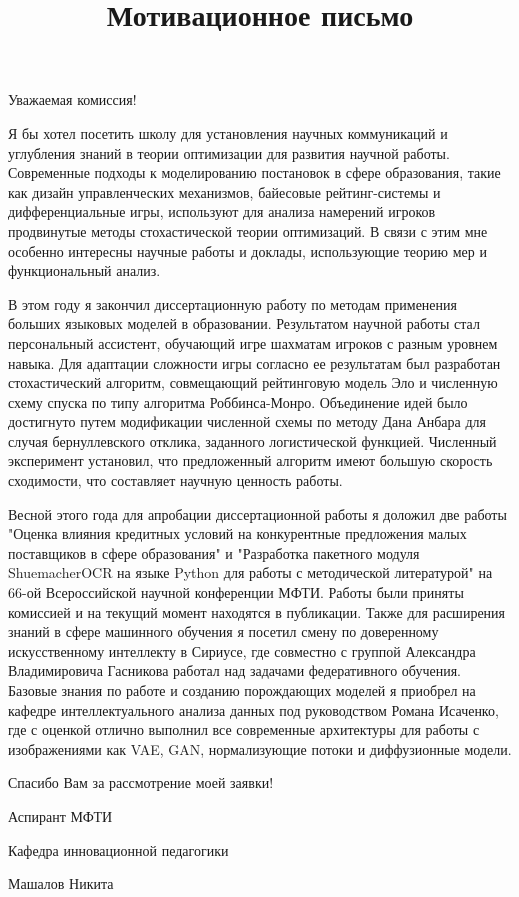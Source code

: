 \documentclass[a4paper,11pt]{article}
\begin{document}
\title{Мотивационное письмо}
\date{\vspace{-12ex}}
\maketitle
\thispagestyle{empty}
Уважаемая комиссия!

Я бы хотел посетить школу для установления научных коммуникаций и углубления знаний в теории оптимизации
для развития научной работы. Современные подходы к моделированию постановок в сфере образования, такие 
как дизайн управленческих механизмов, байесовые рейтинг-системы и дифференциальные игры, используют для анализа 
намерений игроков продвинутые методы стохастической теории оптимизаций. В связи с этим мне особенно интересны научные работы и доклады,
использующие теорию мер и функциональный анализ.

В этом году я закончил диссертационную работу по методам применения больших языковых моделей в образовании. Результатом научной работы
стал персональный ассистент, обучающий игре шахматам игроков с разным уровнем навыка. Для адаптации сложности игры согласно ее результатам
был разработан стохастический алгоритм, совмещающий рейтинговую модель Эло и численную схему спуска по типу алгоритма Роббинса-Монро. Объединение идей было достигнуто 
путем модификации численной схемы по методу Дана Анбара для случая бернуллевского отклика, заданного логистической функцией. Численный эксперимент
установил, что предложенный алгоритм имеют большую скорость сходимости, что составляет научную ценность работы.

Весной этого года для апробации диссертационной работы я доложил две работы 
"Оценка влияния кредитных условий на конкурентные предложения малых поставщиков в сфере образования"
и "Разработка пакетного модуля ShuemacherOCR на языке Python
для работы с методической литературой" на 66-ой Всероссийской научной конференции МФТИ. Работы были приняты комиссией и на текущий
момент находятся в публикации. Также для расширения знаний в сфере машинного обучения я посетил смену по доверенному искусственному интеллекту в Сириусе,
где совместно с группой Александра Владимировича Гасникова работал над задачами федеративного обучения.
Базовые знания по работе и созданию порождающих моделей я приобрел на кафедре интеллектуального анализа данных 
под руководством Романа Исаченко, где с оценкой отлично выполнил все 
современные архитектуры для работы с изображениями как VAE, GAN,
нормализующие потоки и диффузионные модели.

Спасибо Вам за рассмотрение моей заявки!
\begin{FlushRight}
    Аспирант МФТИ

    Кафедра инновационной педагогики
    
    Машалов Никита
\end{FlushRight}
\end{document}
